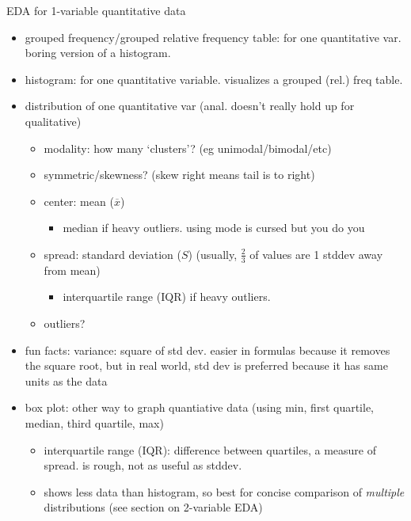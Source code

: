 \documentclass[11pt]{article}
\begin{document}
\newpage
EDA for 1-variable quantitative data
\begin{itemize}
  \item grouped frequency/grouped relative frequency table: for one quantitative var. boring version of a histogram. 
  \item histogram: for one quantitative variable. visualizes a grouped (rel.) freq table.
  \item distribution of one quantitative var (anal. doesn't really hold up for qualitative)
  \begin{itemize}
    \item modality: how many `clusters'? (eg unimodal/bimodal/etc)
    \item symmetric/skewness? (skew right means tail is to right)
    \item center: mean ($\overline{x}$)
    \begin{itemize}
      \item median if heavy outliers. using mode is cursed but you do you
    \end{itemize}
    \item spread: standard deviation ($S$) (usually, $\frac{2}{3}$ of values are 1 stddev away from mean)
    \begin{itemize}
      \item interquartile range (IQR) if heavy outliers.
    \end{itemize}
    \item outliers?
  \end{itemize}
  \item fun facts: variance: square of std dev. easier in formulas because it removes the square root, but in real world, std dev is preferred because it has same units as the data
  \item box plot: other way to graph quantiative data (using min, first quartile, median, third quartile, max)
  \begin{itemize}
    \item interquartile range (IQR): difference between quartiles, a measure of spread. is rough, not as useful as stddev.
    \item shows less data than histogram, so best for concise comparison of \emph{multiple} distributions (see section on 2-variable EDA)
  \end{itemize}
\end{itemize}
\end{document}
